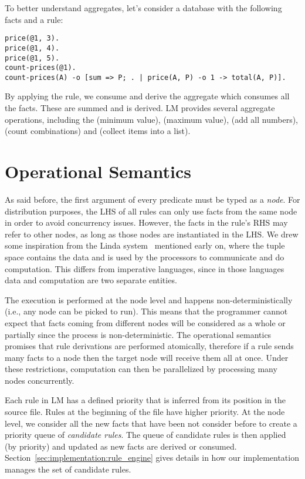 To better understand aggregates, let's consider a database with the following
facts and a rule:

\begin{Verbatim}[fontsize=\codesize]
price(@1, 3).
price(@1, 4).
price(@1, 5).
count-prices(@1).
count-prices(A) -o [sum => P; . | price(A, P) -o 1 -> total(A, P)].
\end{Verbatim}

By applying the rule, we consume  and derive the
aggregate which consumes all the  facts.  These are summed
and  is derived. LM provides several aggregate operations,
including the  (minimum value),  (maximum value),
 (add all numbers),  (count combinations) and
 (collect items into a list).

\section{Operational Semantics}

As said before, the first argument of every predicate must be typed as a
\emph{node}.  For distribution purposes, the LHS of all rules can only use facts
from the same node in order to avoid concurrency issues. However, the facts in
the rule's RHS may refer to other nodes, as long as those nodes are instantiated
in the LHS. We drew some inspiration from the Linda system~\cite{linda}
mentioned early on, where the tuple space contains the data and is used by the
processors to communicate and do computation.  This differs from imperative
languages, since in those languages data and computation are two separate
entities.

The execution is performed at the node level and happens non-deterministically
(i.e., any node can be picked to run). This means that the programmer cannot
expect that facts coming from different nodes will be considered as a whole or
partially since the process is non-deterministic. The operational semantics
promises that rule derivations are performed atomically, therefore if a rule
sends many facts to a node then the target node will receive them all at once.
Under these restrictions, computation can then be parallelized by processing
many nodes concurrently.

Each rule in LM has a defined priority that is inferred from its position in the
source file.  Rules at the beginning of the file have higher priority. At the
node level, we consider all the new facts that have been not consider before to
create a priority queue of \emph{candidate rules}.  The queue of candidate rules
is then applied (by priority) and updated as new facts are derived or consumed.
Section~\ref{sec:implementation:rule_engine} gives details in how our
implementation manages the set of candidate rules.

